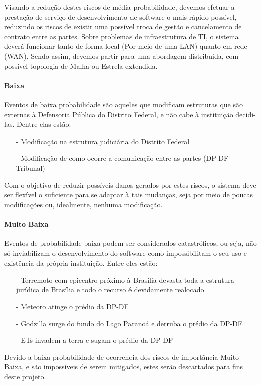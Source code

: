 \documentclass[12pt,a4paper]{report}
\begin{document}
Visando a redução destes riscos de média probabilidade, devemos efetuar a prestação de serviço de desenvolvimento de software o mais rápido possível, reduzindo os riscos de existir uma possível troca de gestão e cancelamento de contrato entre as partes.
Sobre problemas de infraestrutura de TI, o sistema deverá funcionar tanto de forma local (Por meio de uma LAN) quanto em rede (WAN). Sendo assim, devemos partir para uma abordagem distribuida, com possível topologia de Malha ou Estrela extendida.

\paragraph{Baixa} Eventos de baixa probabilidade são aqueles que modificam estruturas que são externas à Defensoria Pública do Distrito Federal, e não cabe à instituição decidi-las. Dentre elas estão:
\begin{itemize}
\item [-] Modificação na estrutura judiciária do Distrito Federal
\item [-] Modificação de como ocorre a comunicação entre as partes (DP-DF - Tribunal)
\end{itemize}

Com o objetivo de reduzir possíveis danos gerados por estes riscos, o sistema deve ser flexível o suficiente para se adaptar à tais mudanças, seja por meio de poucas modificações ou, idealmente, nenhuma modificação.

\paragraph{Muito Baixa} Eventos de probabilidade baixa podem ser considerados catastróficos, ou seja, não só inviabilizam o desenvolvimento do software como impossibilitam o seu uso e existência da própria instituição. Entre eles estão:
\begin{itemize}
\item [-] Terremoto com epicentro próximo à Brasília devasta toda a estrutura jurídica de Brasília e todo o recurso é devidamente realocado
\item [-] Meteoro atinge o prédio da DP-DF
\item [-] Godzilla surge do fundo do Lago Paranoá e derruba o prédio da DP-DF
\item [-] ETs invadem a terra e sugam o prédio da DP-DF
\end{itemize}


Devido a baixa probabilidade de ocorrencia dos riscos de importância Muito Baixa, e são impossíveis de serem mitigados, estes serão descartados para fins deste projeto. 



\end{document}
